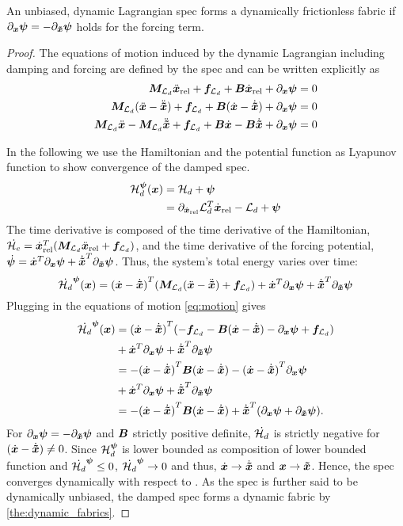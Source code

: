 \begin{lemma}
An unbiased, dynamic Lagrangian spec forms a dynamically frictionless
fabric if  $\partial_{\bm{x}}\bm{\psi} = -\partial_{\bm{\tilde{x}}}\bm{\psi}$ holds for the forcing term.
\label{lem:dynamic_lagrangian_fabrics}
\end{lemma}
\begin{proof}
The equations of motion induced by the dynamic Lagrangian including damping and forcing 
are defined by the spec and can
be written explicitly as
\begin{align}
  \bm{M}_{\mathcal{L}_d}\ddot{\bm{x}}_{\textrm{rel}} + \bm{f}_{\mathcal{L}_d} + \bm{B}\dot{\bm{x}}_{\textrm{rel}} + \partial_{\bm{x}}\bm{\psi} = 0 \nonumber \\
  \bm{M}_{\mathcal{L}_d}(\ddot{\bm{x}} - \ddot{\bm{\tilde{x}}}) + \bm{f}_{\mathcal{L}_d} + \bm{B}(\dot{\bm{x}} - \dot{\bm{\tilde{x}}}) + \partial_{\bm{x}}\bm{\psi} = 0
\label{eq:motion} \\
  \bm{M}_{\mathcal{L}_d}\ddot{\bm{x}} - \bm{M}_{\mathcal{L}_d}\ddot{\bm{\tilde{x}}} + \bm{f}_{\mathcal{L}_d} + \bm{B}\dot{\bm{x}} - \bm{B}\dot{\bm{\tilde{x}}} +
    \partial_{\bm{x}}\bm{\psi} = 0 \nonumber
\end{align}

In the following we use the Hamiltonian and the potential function as Lyapunov function to
show convergence of the damped spec.
\begin{align*}
  \mathcal{H}_d^{\bm{\psi}}(\bm{x}) &= \mathcal{H}_d + \bm{\psi} \\
  &= \partial_{\dot{\bm{x}}_{\textrm{rel}}}\mathcal{L}_d^T\dot{\bm{x}}_{\textrm{rel}} - \mathcal{L}_d + \bm{\psi}
\end{align*}
The time derivative is composed of the time derivative of the Hamiltonian, $\dot{\mathcal{H}_e} =
\dot{\bm{x}}_{\textrm{rel}}^T (\bm{M}_{\mathcal{L}_d}\ddot{\bm{x}}_{\textrm{rel}} + \bm{f}_{\mathcal{L}_d})$, and the time derivative of the forcing potential, 
$\dot{\bm{\psi}} = \dot{\bm{x}}^T\partial_{\bm{x}}\bm{\psi} + \dot{\bm{\tilde{x}}}^T\partial_{\bm{\tilde{x}}}\bm{\psi}$.
Thus, the system's total energy varies over time:
\[
  \dot{\mathcal{H}_d}^{\bm{\psi}}(\bm{x}) = {(\dot{\bm{x}} - \dot{\bm{\tilde{x}}})}^T(\bm{M}_{\mathcal{L}_d} (\ddot{\bm{x}} - \ddot{\bm{\tilde{x}}}) + \bm{f}_{\mathcal{L}_d}) +
\dot{\bm{x}}^T\partial_{\bm{x}}\bm{\psi} + \dot{\bm{\tilde{x}}}^T\partial_{\bm{\tilde{x}}}\bm{\psi}
\]
Plugging in the equations of motion \cref{eq:motion} gives
\begin{align*}
  \dot{\mathcal{H}_d}^{\bm{\psi}}(\bm{x}) &= {(\dot{\bm{x}} - \dot{\bm{\tilde{x}}})}^T(-\bm{f}_{\mathcal{L}_d} - \bm{B}(\dot{\bm{x}} - \dot{\bm{\tilde{x}}}) - \partial_{\bm{x}}\bm{\psi} +
    \bm{f}_{\mathcal{L}_d}) \\
  &  + \dot{\bm{x}}^T\partial_{\bm{x}}\bm{\psi} + \dot{\bm{\tilde{x}}}^T\partial_{\bm{\tilde{x}}}\bm{\psi} \\
  &= -{(\dot{\bm{x}} - \dot{\bm{\tilde{x}}})}^T\bm{B}(\dot{\bm{x}} - \dot{\bm{\tilde{x}}}) - {(\dot{\bm{x}} - \dot{\bm{\tilde{x}}})}^T\partial_{\bm{x}}\bm{\psi} \\
  & + \dot{\bm{x}}^T\partial_{\bm{x}}\bm{\psi} + \dot{\bm{\tilde{x}}}^T\partial_{\bm{\tilde{x}}}\bm{\psi} \\
  &= -{(\dot{\bm{x}} - \dot{\bm{\tilde{x}}})}^T\bm{B}(\dot{\bm{x}} - \dot{\bm{\tilde{x}}})
    + \dot{\bm{\tilde{x}}}^T(\partial_{\bm{x}}\bm{\psi} + \partial_{\bm{\tilde{x}}}\bm{\psi}).
\end{align*}
For $\partial_{\bm{x}}\bm{\psi} = -\partial_{\bm{\tilde{x}}}\bm{\psi}$ and $\bm{B}$ strictly positive definite,
$\dot{\mathcal{H}_d}$ is strictly negative for $(\dot{\bm{x}} - \dot{\bm{\tilde{x}}}) \neq 0$. Since $\mathcal{H}_d^{\bm{\psi}}$ is lower
bounded as composition of lower bounded function and $\dot{\mathcal{H}_d}^{\bm{\psi}} \leq 0$,
$\dot{\mathcal{H}_d}^{\bm{\psi}} \to 0$ and thus, $\dot{\bm{x}} \to \dot{\bm{\tilde{x}}}$ and $\bm{x} \to \bm{\tilde{x}}$. Hence, the spec
converges dynamically with respect to \xt{}.
As the spec is further said to be
dynamically unbiased, the damped spec forms a dynamic fabric by \cref{the:dynamic_fabrics}.
\end{proof}

